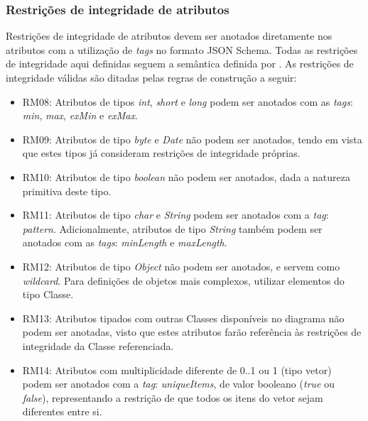 
\subsubsection{Restrições de integridade de atributos}

Restrições de integridade de atributos devem ser anotados diretamente nos atributos com a utilização de \textit{tags} no formato JSON Schema. Todas as restrições de integridade aqui definidas seguem a semântica definida por . As restrições de integridade válidas são ditadas pelas regras de construção a seguir:

\begin{itemize}
    \item RM08: Atributos de tipos \textit{int}, \textit{short} e \textit{long} podem ser anotados com as \textit{tags}: \textit{min}, \textit{max}, \textit{exMin} e \textit{exMax}.

    \item RM09: Atributos de tipo \textit{byte} e \textit{Date} não podem ser anotados, tendo em vista que estes tipos já consideram restrições de integridade próprias.

    \item RM10: Atributos de tipo \textit{boolean} não podem ser anotados, dada a natureza primitiva deste tipo.

    \item RM11: Atributos de tipo \textit{char} e \textit{String} podem ser anotados com a \textit{tag}: \textit{pattern}. Adicionalmente, atributos de tipo \textit{String} também podem ser anotados com as \textit{tags}: \textit{minLength} e \textit{maxLength}.

    \item RM12: Atributos de tipo \textit{Object} não podem ser anotados, e servem como \textit{wildcard}. Para definições de objetos mais complexos, utilizar elementos do tipo Classe.

    \item RM13: Atributos tipados com outras Classes disponíveis no diagrama não podem ser anotadas, visto que estes atributos farão referência às restrições de integridade da Classe referenciada.

    \item RM14: Atributos com multiplicidade diferente de 0..1 ou 1 (tipo vetor) podem ser anotados com a \textit{tag}: \textit{uniqueItems}, de valor booleano (\textit{true} ou \textit{false}), representando a restrição de que todos os itens do vetor sejam diferentes entre si.
\end{itemize}

